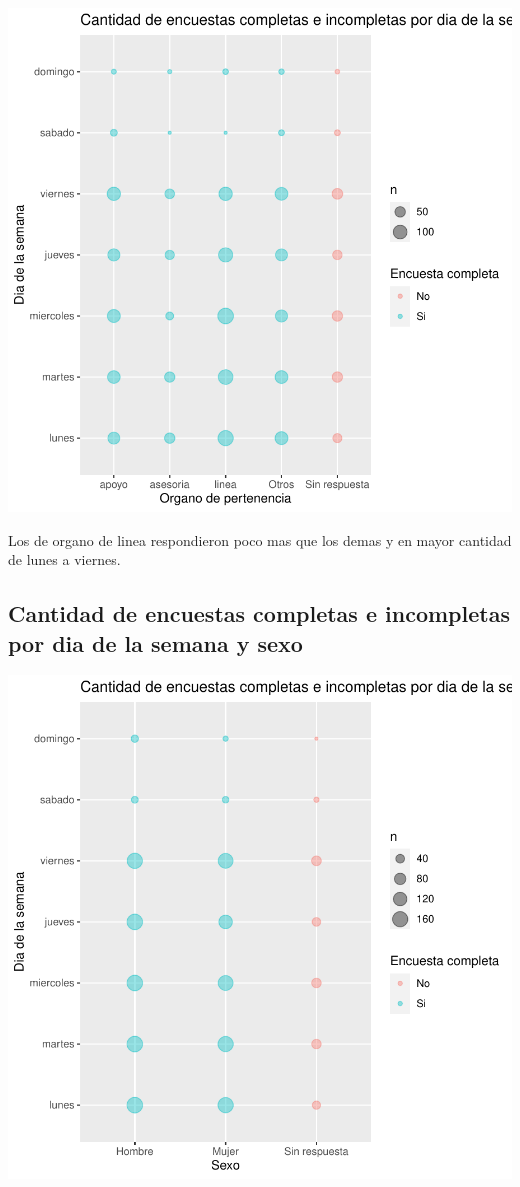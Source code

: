 \documentclass{article}
\begin{document}
\includegraphics{seguimientov3-052}

Los de organo de linea respondieron poco mas que los demas y en mayor cantidad de lunes a viernes.

\subsection{Cantidad de encuestas completas e incompletas por dia de la semana y sexo}

\includegraphics{seguimientov3-053}
\end{document}
